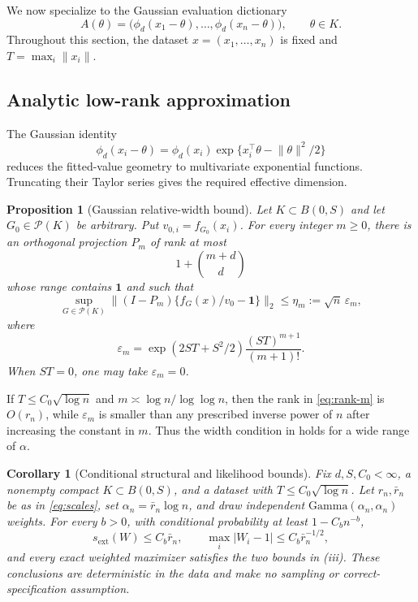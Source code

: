 \documentclass[11pt]{article}
\newtheorem{proposition}[proposition]{Proposition}
\newtheorem{corollary}[corollary]{Corollary}
\theoremstyle{definition}
\theoremstyle{remark}
\newcommand{\Pcal}{\mathcal P}
\newcommand{\one}{\bm 1}
\newcommand{\norm}[1]{\lVert #1\rVert}
\newcommand{\abs}[1]{\lvert #1\rvert}
\newcommand{\eps}{\varepsilon}
\begin{document}
We now specialize  to the Gaussian evaluation dictionary
\[
 A(\theta)=\bigl(\phi_d(x_1-\theta),\ldots,
                    \phi_d(x_n-\theta)\bigr),
 \qquad \theta\in K.
\]
Throughout this section, the dataset $x=(x_1,\ldots,x_n)$ is fixed and
$T=\max_i\norm{x_i}$.

\subsection{Analytic low-rank approximation}

The Gaussian identity
\[
 \phi_d(x_i-\theta)=\phi_d(x_i)
 \exp\{x_i^\top\theta-\norm{\theta}^2/2\}
\]
reduces the fitted-value geometry to multivariate exponential functions.
Truncating their Taylor series gives the required effective dimension.

\begin{proposition}[Gaussian relative-width bound]
\label{prop:gaussian-width}
Let $K\subset B(0,S)$ and let $G_0\in\Pcal(K)$ be arbitrary.  Put
$v_{0,i}=f_{G_0}(x_i)$.  For every integer $m\ge0$, there is an orthogonal
projection $P_m$ of rank at most
\begin{equation}\label{eq:rank-m}
 1+\binom{m+d}{d}
\end{equation}
whose range contains $\one$ and such that
\begin{equation}\label{eq:eta-m}
 \sup_{G\in\Pcal(K)}
 \norm{(I-P_m)\{f_G(x)/v_0-\one\}}_2
 \le \eta_m:=\sqrt n\,\eps_m,
\end{equation}
where
\begin{equation}\label{eq:eps-m}
 \eps_m=\exp(2ST+S^2/2)\frac{(ST)^{m+1}}{(m+1)!}.
\end{equation}
When $ST=0$, one may take $\eps_m=0$.
\end{proposition}

If $T\le C_0\sqrt{\log n}$ and
$m\asymp\log n/\log\log n$, then the rank in \eqref{eq:rank-m} is
$O(r_n)$, while $\eps_m$ is smaller than any prescribed inverse power of
$n$ after increasing the constant in $m$.  Thus the width condition in
 holds for a wide range of $\alpha$.

\begin{corollary}[Conditional structural and likelihood bounds]
\label{cor:conditional}
Fix $d,S,C_0<\infty$, a nonempty compact $K\subset B(0,S)$, and a dataset
with $T\le C_0\sqrt{\log n}$.  Let $r_n,\bar r_n$ be as in
\eqref{eq:scales}, set $\alpha_n=\bar r_n\log n$, and draw independent
$\mathrm{Gamma}(\alpha_n,\alpha_n)$ weights.  For every $b>0$, with
conditional probability at least $1-C_bn^{-b}$,
\[
 s_{\mathrm{ext}}(W)\le C_b\bar r_n,
 \qquad
 \max_i\abs{W_i-1}\le C_b\bar r_n^{-1/2},
\]
and every exact weighted maximizer satisfies the two bounds in
(iii).  These conclusions are deterministic in the data and
make no sampling or correct-specification assumption.
\end{corollary}
\end{document}
